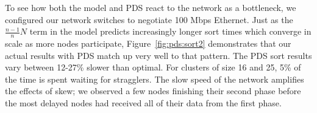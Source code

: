 To see how both the model and PDS react to the network as a
bottleneck, we configured our network switches to negotiate 100 Mbps
Ethernet.  Just as the $\frac{n-1}{n} N$ term in the model predicts
increasingly longer sort times which converge in scale as more nodes
participate, Figure~\ref{fig:pds:sort2} demonstrates that our actual
results with PDS match up very well to that pattern.  The PDS sort
results vary between 12-27\% slower than optimal.
For clusters of size 16 and 25, 5\% of the time is spent waiting for
stragglers. The slow speed of the network amplifies the effects of
skew; we observed a few nodes finishing their second phase before the
most delayed nodes had received all of their data from the first
phase.


